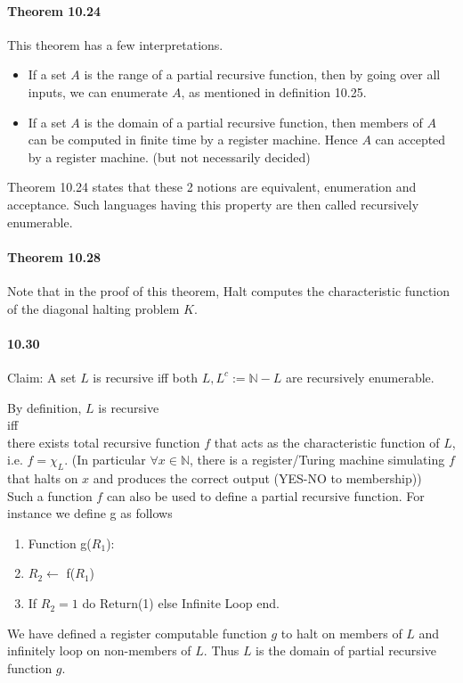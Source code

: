 \documentclass{article}
\begin{document}
\paragraph{Theorem 10.24} This theorem has a few interpretations.
\begin{itemize}
	\item If a set $A$ is the range of a partial recursive function, then by going over all inputs, we can enumerate $A$, as mentioned in definition 10.25.
	\item If a set $A$ is the domain of a partial recursive function, then members of $A$ can be computed in finite time by a register machine. Hence $A$ can accepted by a register machine. (but not necessarily decided)
\end{itemize}
Theorem 10.24 states that these 2 notions are equivalent, enumeration and acceptance. Such languages having this property are then called recursively enumerable.

\paragraph{Theorem 10.28} Note that in the proof of this theorem, Halt computes the characteristic function of the diagonal halting problem $K$.

\paragraph{10.30} Claim: A set $L$ is recursive iff both $L, L^c:=\mathbb{N}-L$ are recursively enumerable.

By definition, $L$ is recursive\\ 
iff\\
there exists total recursive function $f$ that acts as the characteristic function of $L$, i.e. $f=\chi_L$. (In particular $\forall x\in \mathbb{N}$, there is a register/Turing machine simulating $f$ that halts on $x$ and produces the correct output (YES-NO to membership))\\

Such a function $f$ can also be used to define a partial recursive function. For instance we define g as follows
\begin{enumerate}
	\item Function g($R_1$):
	\item $R_2\gets$ f($R_1$)
	\item If $R_2=1$ do Return(1) else Infinite Loop end.
\end{enumerate}
We have defined a register computable function $g$ to halt on members of $L$ and infinitely loop on non-members of $L$. Thus $L$ is the domain of partial recursive function $g$.
\end{document}
